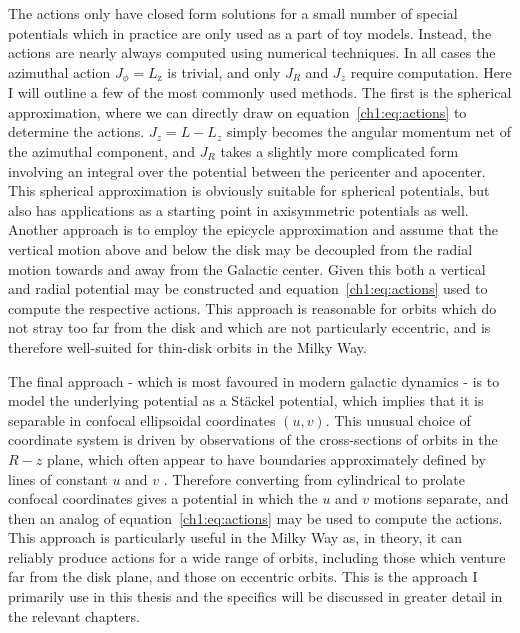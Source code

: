 The actions only have closed form solutions for a small number of special potentials \parencite[again the potential of ][ for example]{henon59a} which in practice are only used as a part of toy models. Instead, the actions are nearly always computed using numerical techniques. In all cases the azimuthal action $J_{\phi} = L_\mathrm{z}$ is trivial, and only $J_{R}$ and $J_{z}$ require computation. Here I will outline a few of the most commonly used methods. The first is the spherical approximation, where we can directly draw on equation~\ref{ch1:eq:actions} to determine the actions. $J_{z} = L - L_{z}$ simply becomes the angular momentum net of the azimuthal component, and $J_{R}$ takes a slightly more complicated form involving an integral over the potential between the pericenter and apocenter. This spherical approximation is obviously suitable for spherical potentials, but also has applications as a starting point in axisymmetric potentials as well. Another approach is to employ the epicycle approximation and assume that the vertical motion above and below the disk may be decoupled from the radial motion towards and away from the Galactic center. Given this both a vertical and radial potential may be constructed and equation~\ref{ch1:eq:actions} used to compute the respective actions. This approach is reasonable for orbits which do not stray too far from the disk and which are not particularly eccentric, and is therefore well-suited for thin-disk orbits in the Milky Way.

The final approach - which is most favoured in modern galactic dynamics - is to model the underlying potential as a St\"{a}ckel potential, which implies that it is separable in confocal ellipsoidal coordinates $(u,v)$. This unusual choice of coordinate system is driven by observations of the cross-sections of orbits in the $R-z$ plane, which often appear to have boundaries approximately defined by lines of constant $u$ and $v$ \parencite[see figure 3.27 in ][]{binney08}. Therefore converting from cylindrical to prolate confocal coordinates gives a potential in which the $u$ and $v$ motions separate, and then an analog of equation~\eqref{ch1:eq:actions} may be used to compute the actions. This approach is particularly useful in the Milky Way as, in theory, it can reliably produce actions for a wide range of orbits, including those which venture far from the disk plane, and those on eccentric orbits. This is the approach I primarily use in this thesis and the specifics will be discussed in greater detail in the relevant chapters.

